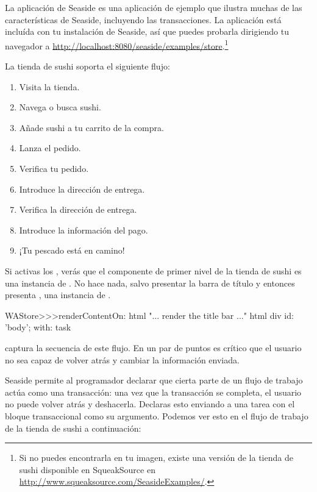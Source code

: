 \documentclass[a4paper,10pt,twoside]{book}
\begin{document}
La aplicación de Seaside  es una aplicación de ejemplo que ilustra muchas de las características de Seaside, incluyendo las transacciones.
La aplicación está incluída con tu instalación de Seaside, así que puedes probarla dirigiendo tu navegador a
\url{http://localhost:8080/seaside/examples/store}.\footnote{Si no puedes encontrarla en tu imagen, existe una versión de la tienda de sushi disponible en SqueakSource en \url{http://www.squeaksource.com/SeasideExamples/}.}

La tienda de sushi soporta el siguiente flujo:
\begin{enumerate}[itemsep=0pt]
  \item Visita la tienda.
  \item Navega o busca sushi.
  \item Añade sushi a tu carrito de la compra.
  \item Lanza el pedido.
  \item Verifica tu pedido.
  \item Introduce la dirección de entrega.
  \item Verifica la dirección de entrega.
  \item Introduce la información del pago.
  \item ¡Tu pescado está en camino!
\end{enumerate}

Si activas los , verás que el componente de primer nivel de la tienda de sushi es una instancia de .
No hace nada, salvo presentar la barra de título y entonces presenta , una instancia de  .

\begin{code}{}
WAStore>>>renderContentOn: html
	"... render the title bar ..."
	html div id: 'body'; with: task
\end{code}

 captura la secuencia de este flujo. En un par de puntos es crítico que el usuario no sea capaz de volver atrás y cambiar la información enviada.


Seaside permite al programador declarar que cierta parte de un flujo de trabajo actúa como una transacción: una vez que la transacción se completa, el usuario no puede volver atrás y deshacerla.
Declaras esto enviando  a una tarea con el bloque transaccional como su argumento.
Podemos ver esto en el flujo de trabajo de la tienda de sushi a continuación:
\end{document}
